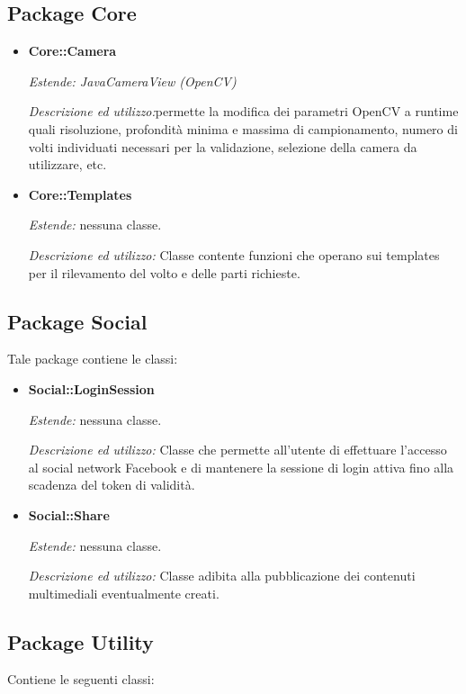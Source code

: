 \subsection{Package Core}

\begin{itemize}
\item \textbf{Core::Camera}

\textit{Estende: JavaCameraView (OpenCV)}

\textit{Descrizione ed utilizzo:}permette la modifica dei parametri OpenCV a runtime quali risoluzione, profondità minima e massima di campionamento, numero di volti individuati necessari per la validazione, selezione della camera da utilizzare, etc.

\item \textbf{Core::Templates}

\textit{Estende:} nessuna classe. 

\textit{Descrizione ed utilizzo:} Classe contente funzioni che operano sui templates per il rilevamento del volto e delle parti richieste.
\end{itemize}
\subsection{Package Social}

Tale package contiene le classi:
\begin{itemize}
\item \textbf{Social::LoginSession}

\textit{Estende:} nessuna classe.

\textit{Descrizione ed utilizzo:} Classe che permette all'utente di effettuare l'accesso al social network Facebook e di mantenere la sessione di login attiva fino alla scadenza del token di validità.

\item \textbf{Social::Share}

\textit{Estende:} nessuna classe.

\textit{Descrizione ed utilizzo:} Classe adibita alla pubblicazione dei contenuti multimediali eventualmente creati.
\end{itemize}

\subsection{Package Utility}
Contiene le seguenti classi:

